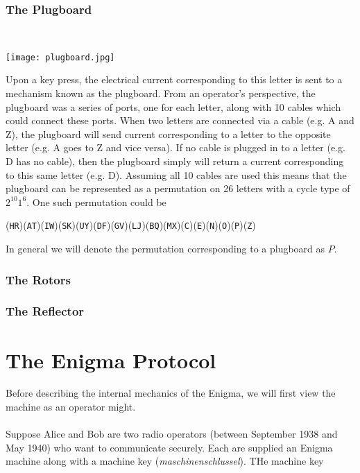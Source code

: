 \subsubsection{The Plugboard}
\text{}\\
\begin{center}\texttt{[image: plugboard.jpg]}
\end{center}
Upon a key press, the electrical current corresponding to this letter
is sent to a mechanism known as the plugboard. From an operator's
perspective, the plugboard was a series of ports, one for each
letter, along with 10 cables which could connect these ports. When
two letters are connected via a cable (e.g. A and Z), the plugboard
will send current corresponding to a letter to the opposite letter
(e.g. A goes to Z and vice versa). If no cable is plugged in to a
letter (e.g. D has no cable), then the plugboard simply will return a
current corresponding to this same letter (e.g. D). Assuming all 10
cables are used this means that the plugboard can be represented as a
permutation on 26 letters with a cycle type of $2^{10}1^6$. One such
permutation could be
\begin{center}
  (\texttt{HR})(\texttt{AT})(\texttt{IW})(\texttt{SK})(\texttt{UY})(\texttt{DF})(\texttt{GV})(\texttt{LJ})(\texttt{BQ})(\texttt{MX})(\texttt{C})(\texttt{E})(\texttt{N})(\texttt{O})(\texttt{P})(\texttt{Z})
\end{center}
In general we will denote the permutation corresponding to a plugboard as $P$.

\subsubsection{The Rotors}

\subsubsection{The Reflector}

\section{The Enigma Protocol}
Before describing the internal mechanics of the Enigma, we will first
view the machine as an operator might.
\\\\Suppose Alice and Bob are two radio operators (between September
1938 and May 1940) who want to communicate securely. Each are
supplied an Enigma machine along with a machine key
(\emph{maschinenschlussel}). THe machine key

